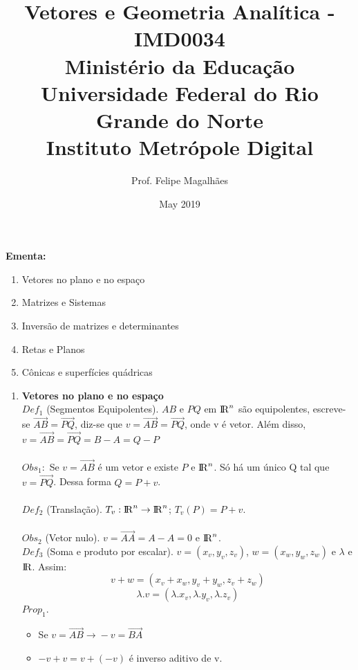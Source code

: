 \documentclass{article}
\title{Vetores e Geometria Analítica - IMD0034\\
        Ministério da Educação\\
        Universidade Federal do Rio Grande do Norte\\
        Instituto Metrópole Digital
}
\author{Prof. Felipe Magalhães}
\date{May 2019}
\begin{document}
\maketitle

\large{\textbf{Ementa:}}
    \begin{enumerate}
        \item  Vetores no plano e no espaço
        \item Matrizes e Sistemas
        \item Inversão de matrizes e determinantes
        \item Retas e Planos
        \item Cônicas e superfícies quádricas
    \end{enumerate}
\vspace{10pt}

\begin{enumerate}
    \item \textbf{Vetores no plano e no espaço}\\
        $Def_1$ (Segmentos Equipolentes). $AB$ e $PQ$ em ${\rm I\!R}^n$ são equipolentes, escreve-se $\overrightarrow{AB} = \overrightarrow{PQ}$, diz-se que $v = \overrightarrow{AB} = \overrightarrow{PQ}$, onde v é vetor. Além disso, $v = \overrightarrow{AB} = \overrightarrow{PQ} = B - A = Q - P $\\ 
        \\
        $Obs_1:$ Se $v = \overrightarrow{AB}$ é um vetor e existe $P$ e ${\rm I\!R}^n$. Só há um único Q tal que $v = \overrightarrow{PQ}$. Dessa forma $Q = P + v$.\\
        \\
        $Def_2$ (Translação). $T_v: {\rm I\!R}^n \rightarrow {\rm I\!R}^n$; $T_v(P) = P +v$.\\
        \\
        $Obs_2$ (Vetor nulo). $v = \overrightarrow{AA} = A - A = 0$ e ${\rm I\!R}^n$.
        \\
        $Def_3$ (Soma e produto por escalar). $v = (x_v, y_v, z_v)$, $w = (x_w, y_w, z_w)$ e $\lambda$ e ${\rm I\!R}$. Assim:
            $$ v + w  = (x_v + x_w, y_v + y_w, z_v + z_w)$$
            $$ \lambda . v = (\lambda . x_v, \lambda . y_v, \lambda . z_v)$$
        $Prop_1$.
        \begin{itemize}
            \item \hspace{1pt} Se $v = \overrightarrow{AB} \rightarrow{} -v = \overrightarrow{BA}$
            \item $-v + v = v + (-v)$ é inverso aditivo de v.

\end{itemize}
\end{enumerate}
\end{document}
